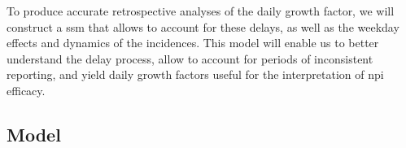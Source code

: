 To produce accurate retrospective analyses of the daily growth factor, we will construct a \acrshort{ssm} that allows to account for these delays, as well as the weekday effects and dynamics of the incidences. This model will enable us to better understand the delay process, allow to account for periods of inconsistent reporting, and yield daily growth factors useful for the interpretation of \acrshort{npi} efficacy.


\subsection{Model}

